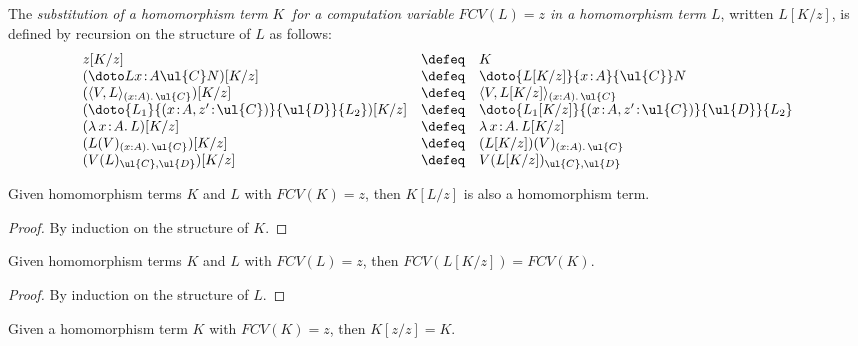 \begin{definition}
The \emph{substitution of a homomorphism term $K$ \,for a computation variable $FCV(L) = z$ in a homomorphism term $L$}, written $L[K/z]$, is defined by recursion on the structure of $L$ as follows:
\[
\begin{array}{l c l}
z[K/z] & \defeq & K
\\
(\doto L {x \!:\! A} {\ul{C}} N)[K/z] & \defeq & \doto {L[K/z]} {x \!:\! A} {\ul{C}} N
\\
(\langle V , L \rangle_{(x : A).\, \ul{C}})[K/z] & \defeq & \langle V , L[K/z] \rangle_{(x : A).\, \ul{C}}
\\
(\doto {L_1} {(x \!:\! A, z' \!:\! \ul{C})} {\ul{D}} {L_2})[K/z] & \defeq & \doto {L_1[K/z]} {(x \!:\! A, z' \!:\! \ul{C})} {\ul{D}} {L_2}
\\
(\lambda \, x \!:\! A .\, L)[K/z] & \defeq & \lambda \, x \!:\! A .\, L[K/z]
\\
(L(V)_{(x : A).\, \ul{C}})[K/z] & \defeq & (L[K/z])(V)_{(x : A).\, \ul{C}}
\\
(V(L)_{\ul{C}, \ul{D}})[K/z] & \defeq & V(L[K/z])_{\ul{C}, \ul{D}}
\end{array}
\]
\end{definition}
\vspace{0.2cm}

\begin{proposition}
Given homomorphism terms $K$ and $L$ with $FCV(K) = z$, then $K[L/z]$ is also a homomorphism term.
\end{proposition}

\begin{proof}
By induction on the structure of $K$.
\end{proof}

\begin{proposition}
\label{prop:compvariableofhomsubst}
Given homomorphism terms $K$ and $L$ with $FCV(L) = z$, then $FCV(L[K/z]) = FCV(K)$.
\end{proposition}

\begin{proof}
By induction on the structure of $L$.
\end{proof}

\begin{proposition}
\label{prop:homsubstlemma}
Given a homomorphism term $K$ with $FCV(K) \!=\! z$, then $K[z/z] \!=\! K$.
\end{proposition}

